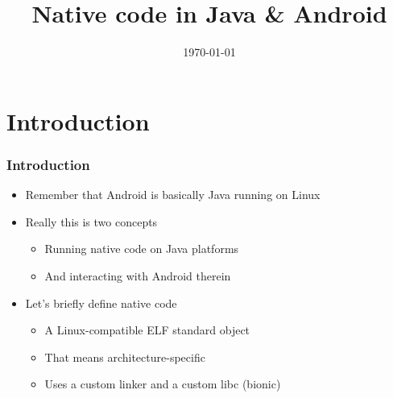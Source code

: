 \documentclass[10pt,mathserif]{beamer}
\title{\large \bfseries Native code in Java \& Android}
\date{\today}
\begin{document}
	\frame{
		\thispagestyle{empty}
		\titlepage
	}

	\section{Introduction}

	\begin{frame}
		\frametitle{Introduction}

		\begin{itemize}
			\item Remember that Android is basically Java running on Linux
			\item Really this is two concepts
			\begin{itemize}
				\item Running native code on Java platforms
				\item And interacting with Android therein
			\end{itemize}
			\item Let's briefly define native code
			\begin{itemize}
				\item A Linux-compatible ELF standard object
				\item That means architecture-specific
				\item Uses a custom linker and a custom libc (bionic)
			\end{itemize}
		\end{itemize}
	\end{frame}
\end{document}
